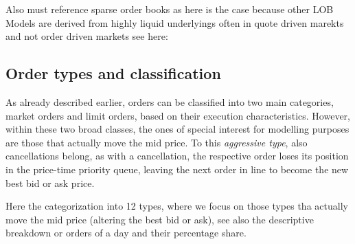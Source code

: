 \documentclass[12pt,a4paper]{cau_thesis}
\begin{document}
Also must reference sparse order books as here is the case because
other LOB Models are derived from highly liquid underlyings often in
quote driven marekts and not order driven markets see here:
\cite{bergault2025simulating}

\subsection{Order types and classification}\label{sub_sec:order_types}
As already described earlier, orders can be classified into two main
categories, market orders and limit orders, based on their execution
characteristics. However, within these two broad classes, the ones of
special interest for modelling purposes are those that actually move
the mid price. To this \textit{aggressive type}, also cancellations
belong, as with a cancellation, the respective order loses its
position in the price-time priority queue, leaving the next order in
line to become the new best bid or ask price.

Here the categorization into 12 types, where we focus on those types
tha actually move the mid price (altering the best bid or ask), see
also the descriptive breakdown or orders of a day and their
percentage share.
\end{document}
